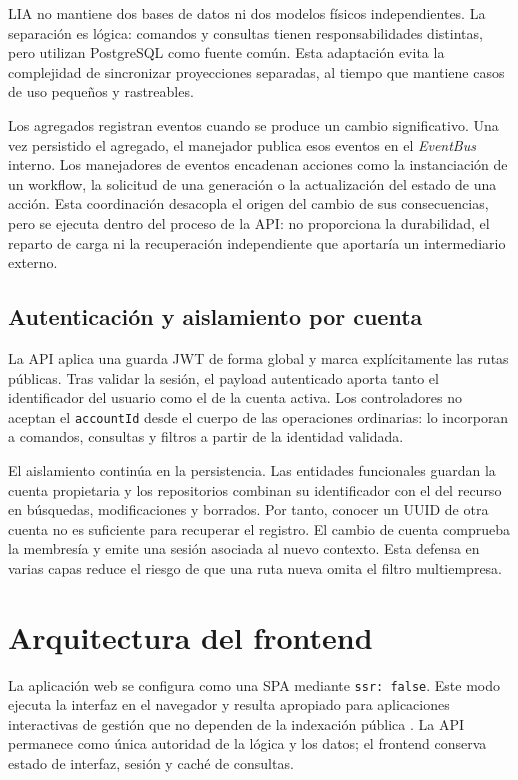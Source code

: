 LIA no mantiene dos bases de datos ni dos modelos físicos independientes. La
separación es lógica: comandos y consultas tienen responsabilidades distintas,
pero utilizan PostgreSQL como fuente común. Esta adaptación evita la
complejidad de sincronizar proyecciones separadas, al tiempo que mantiene casos
de uso pequeños y rastreables.

Los agregados registran eventos cuando se produce un cambio significativo. Una
vez persistido el agregado, el manejador publica esos eventos en el
\emph{EventBus} interno. Los manejadores de eventos encadenan acciones como la
instanciación de un workflow, la solicitud de una generación o la actualización
del estado de una acción. Esta coordinación desacopla el origen del cambio de
sus consecuencias, pero se ejecuta dentro del proceso de la API: no proporciona
la durabilidad, el reparto de carga ni la recuperación independiente que
aportaría un intermediario externo.

\subsection{Autenticación y aislamiento por cuenta}
\label{subsec:account-isolation-architecture}

La API aplica una guarda JWT de forma global y marca explícitamente las rutas
públicas. Tras validar la sesión, el payload autenticado aporta tanto el
identificador del usuario como el de la cuenta activa. Los controladores no
aceptan el \texttt{accountId} desde el cuerpo de las operaciones ordinarias:
lo incorporan a comandos, consultas y filtros a partir de la identidad
validada.

El aislamiento continúa en la persistencia. Las entidades funcionales guardan
la cuenta propietaria y los repositorios combinan su identificador con el del
recurso en búsquedas, modificaciones y borrados. Por tanto, conocer un UUID de
otra cuenta no es suficiente para recuperar el registro. El cambio de cuenta
comprueba la membresía y emite una sesión asociada al nuevo contexto. Esta
defensa en varias capas reduce el riesgo de que una ruta nueva omita el filtro
multiempresa.

\section{Arquitectura del frontend}
\label{sec:frontend-architecture}

La aplicación web se configura como una SPA mediante \texttt{ssr: false}. Este
modo ejecuta la interfaz en el navegador y resulta apropiado para aplicaciones
interactivas de gestión que no dependen de la indexación pública
\cite{nuxtRendering}. La API permanece como única autoridad de la lógica y los
datos; el frontend conserva estado de interfaz, sesión y caché de consultas.

